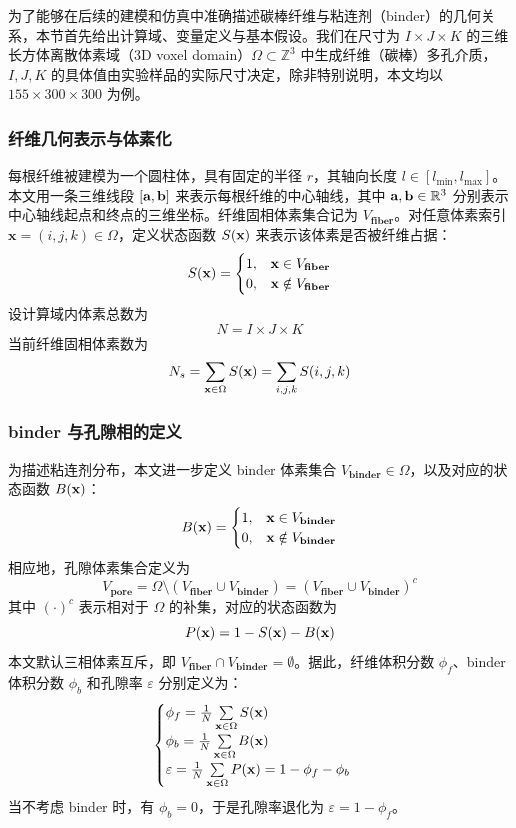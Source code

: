 为了能够在后续的建模和仿真中准确描述碳棒纤维与粘连剂（binder）的几何关系，本节首先给出计算域、变量定义与基本假设。我们在尺寸为 $I \times J \times K$ 的三维长方体离散体素域（3D voxel domain）$\Omega \subset \mathbb{Z}^3$ 中生成纤维（碳棒）多孔介质，$I,J,K$ 的具体值由实验样品的实际尺寸决定，除非特别说明，本文均以 $155 \times 300 \times 300$ 为例。

\subsubsection{\textbf{纤维几何表示与体素化}}

每根纤维被建模为一个圆柱体，具有固定的半径 $r$，其轴向长度 $l \in [l_{\min}, l_{\max}]$。本文用一条三维线段 $[\textbf a, \textbf b]$ 来表示每根纤维的中心轴线，其中 $\textbf a,\textbf b \in \mathbb{R}^3$ 分别表示中心轴线起点和终点的三维坐标。纤维固相体素集合记为 $V_{\textbf{fiber}}$。对任意体素索引 $\textbf{x} = (i,j,k) \in \Omega$，定义状态函数 $S(\textbf x)$ 来表示该体素是否被纤维占据：
\[
S(\textbf x) = 
\begin{cases}
1, & \textbf{x} \in V_{\textbf{fiber}}  \\
0, & \textbf{x} \notin V_{\textbf{fiber}} 
\end{cases}
\]
设计算域内体素总数为
\[
N = I \times J \times K
\]
当前纤维固相体素数为
\[
N_s = \sum \limits_{\textbf{x} \in \Omega} S(\textbf x) = \sum \limits_{i,j,k} S(i,j,k)
\]

\subsubsection{\textbf{binder 与孔隙相的定义}}

为描述粘连剂分布，本文进一步定义 binder 体素集合 $V_{\textbf{binder}} \in \Omega$，以及对应的状态函数 $B(\textbf x)$：
\[
B(\textbf x) =
\begin{cases}
1, & \textbf{x} \in V_{\textbf{binder}}  \\
0, & \textbf{x} \notin V_{\textbf{binder}} 
\end{cases}
\]
相应地，孔隙体素集合定义为
\[
V_{\textbf{pore}} = \Omega \setminus (V_{\textbf{fiber}} \cup V_{\textbf{binder}}) = (V_{\textbf{fiber}} \cup V_{\textbf{binder}})^c
\]
其中 $(\cdot)^c$ 表示相对于 $\Omega$ 的补集，对应的状态函数为
\[
P(\textbf x) = 1 - S(\textbf x) - B(\textbf x)
\]
本文默认三相体素互斥，即 $V_{\textbf{fiber}} \cap V_{\textbf{binder}} = \emptyset$。据此，纤维体积分数 $\phi_{f}$、binder 体积分数 $\phi_{b}$ 和孔隙率 $\varepsilon$ 分别定义为：
\[
\begin{cases}
\phi_{f} = \frac{1}{N} \sum \limits_{\textbf{x} \in \Omega} S(\textbf x) \\
\phi_{b} = \frac{1}{N} \sum \limits_{\textbf{x} \in \Omega} B(\textbf x) \\
\varepsilon = \frac{1}{N} \sum \limits_{\textbf{x} \in \Omega} P(\textbf x) = 1 - \phi_{f} - \phi_{b}
\end{cases}
\]
当不考虑 binder 时，有 $\phi_{b} = 0$，于是孔隙率退化为 $\varepsilon = 1 - \phi_{f}$。

